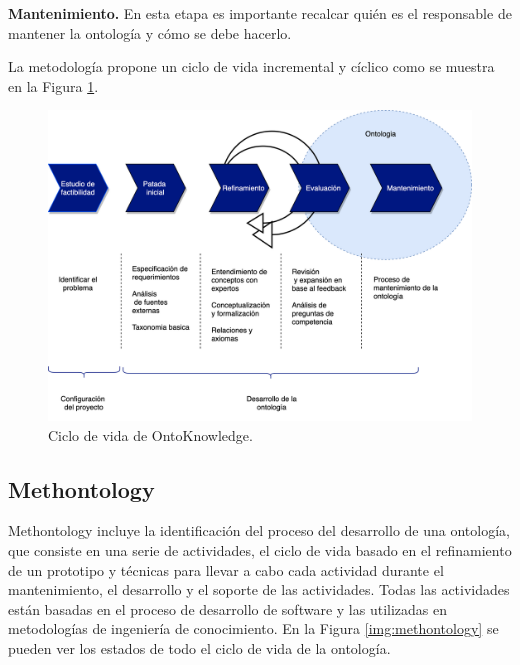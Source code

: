 \textbf{Mantenimiento.} En esta etapa es importante recalcar quién es el responsable de mantener la ontología y cómo se debe hacerlo.

La metodología propone un ciclo de vida incremental y cíclico como se muestra en la Figura \ref{img:ontoknowledge}.

\begin{figure}[h!]
    \centering
    \includegraphics[width=150mm]{figuras/Diagramas-OntoKnowledgeProcess}
    \caption{Ciclo de vida de OntoKnowledge. \cite{ontoKnowledgeFig}}
    \label{img:ontoknowledge}
    \end{figure}

\subsection{Methontology}
\label{subsection:methontology}

Methontology\cite{fernandez1997methontology} incluye la identificación del proceso del desarrollo de una ontología, que consiste en una serie de actividades, el ciclo de vida basado en el refinamiento de un prototipo y técnicas para llevar a cabo cada actividad durante el mantenimiento, el desarrollo y el soporte de las actividades. Todas las actividades están basadas en el proceso de desarrollo de software y las utilizadas en metodologías de ingeniería de conocimiento. En la Figura \ref{img:methontology} se pueden ver los estados de todo el ciclo de vida de la ontología.


